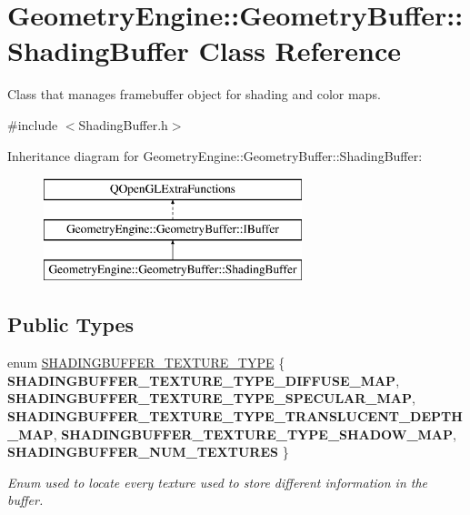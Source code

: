 \hypertarget{class_geometry_engine_1_1_geometry_buffer_1_1_shading_buffer}{}\section{Geometry\+Engine\+::Geometry\+Buffer\+::Shading\+Buffer Class Reference}
\label{class_geometry_engine_1_1_geometry_buffer_1_1_shading_buffer}


Class that manages framebuffer object for shading and color maps.  




{\ttfamily \#include $<$Shading\+Buffer.\+h$>$}

Inheritance diagram for Geometry\+Engine\+::Geometry\+Buffer\+::Shading\+Buffer\+:\begin{figure}[H]
\begin{center}
\leavevmode
\includegraphics[height=3.000000cm]{class_geometry_engine_1_1_geometry_buffer_1_1_shading_buffer}
\end{center}
\end{figure}
\subsection*{Public Types}
\begin{DoxyCompactItemize}
\item 
\mbox{\label{class_geometry_engine_1_1_geometry_buffer_1_1_shading_buffer_a8047a079ff9fb9fa3400651664c92ae9}} 
enum \mbox{\hyperlink{class_geometry_engine_1_1_geometry_buffer_1_1_shading_buffer_a8047a079ff9fb9fa3400651664c92ae9}{S\+H\+A\+D\+I\+N\+G\+B\+U\+F\+F\+E\+R\+\_\+\+T\+E\+X\+T\+U\+R\+E\+\_\+\+T\+Y\+PE}} \{ \newline
{\bfseries S\+H\+A\+D\+I\+N\+G\+B\+U\+F\+F\+E\+R\+\_\+\+T\+E\+X\+T\+U\+R\+E\+\_\+\+T\+Y\+P\+E\+\_\+\+D\+I\+F\+F\+U\+S\+E\+\_\+\+M\+AP}, 
{\bfseries S\+H\+A\+D\+I\+N\+G\+B\+U\+F\+F\+E\+R\+\_\+\+T\+E\+X\+T\+U\+R\+E\+\_\+\+T\+Y\+P\+E\+\_\+\+S\+P\+E\+C\+U\+L\+A\+R\+\_\+\+M\+AP}, 
{\bfseries S\+H\+A\+D\+I\+N\+G\+B\+U\+F\+F\+E\+R\+\_\+\+T\+E\+X\+T\+U\+R\+E\+\_\+\+T\+Y\+P\+E\+\_\+\+T\+R\+A\+N\+S\+L\+U\+C\+E\+N\+T\+\_\+\+D\+E\+P\+T\+H\+\_\+\+M\+AP}, 
{\bfseries S\+H\+A\+D\+I\+N\+G\+B\+U\+F\+F\+E\+R\+\_\+\+T\+E\+X\+T\+U\+R\+E\+\_\+\+T\+Y\+P\+E\+\_\+\+S\+H\+A\+D\+O\+W\+\_\+\+M\+AP}, 
\newline
{\bfseries S\+H\+A\+D\+I\+N\+G\+B\+U\+F\+F\+E\+R\+\_\+\+N\+U\+M\+\_\+\+T\+E\+X\+T\+U\+R\+ES}
 \}
\begin{DoxyCompactList}\small\item\em Enum used to locate every texture used to store different information in the buffer. \end{DoxyCompactList}\end{DoxyCompactItemize}
